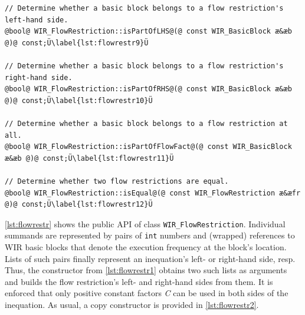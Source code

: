 \begin{lstlisting}[style=code,float=!b,caption={Public Interface of Class \texttt{WIR\_FlowRestriction}},label=lst:flowrestr]
// Determine whether a basic block belongs to a flow restriction's left-hand side.
@bool@ WIR_FlowRestriction::isPartOfLHS@(@ const WIR_BasicBlock æ&æb @)@ const;Ü\label{lst:flowrestr9}Ü

// Determine whether a basic block belongs to a flow restriction's right-hand side.
@bool@ WIR_FlowRestriction::isPartOfRHS@(@ const WIR_BasicBlock æ&æb @)@ const;Ü\label{lst:flowrestr10}Ü

// Determine whether a basic block belongs to a flow restriction at all.
@bool@ WIR_FlowRestriction::isPartOfFlowFact@(@ const WIR_BasicBlock æ&æb @)@ const;Ü\label{lst:flowrestr11}Ü

// Determine whether two flow restrictions are equal.
@bool@ WIR_FlowRestriction::isEqual@(@ const WIR_FlowRestriction æ&æfr @)@ const;Ü\label{lst:flowrestr12}Ü
\end{lstlisting}

\cref{lst:flowrestr} shows the public \gls{API} of class \texttt{WIR\_FlowRestriction}.
Individual summands are represented by pairs of \texttt{int} numbers and (wrapped) references to \gls{WIR} basic blocks that denote the execution frequency at the block's location.
Lists of such pairs finally represent an inequation's left- or right-hand side, resp.
Thus, the constructor from \cref{lst:flowrestr1} obtains two such lists as arguments and builds the flow restriction's left- and right-hand sides from them.
It is enforced that only positive constant factors \textit{C} can be used in both sides of the inequation.
As usual, a copy constructor is provided in \cref{lst:flowrestr2}.

